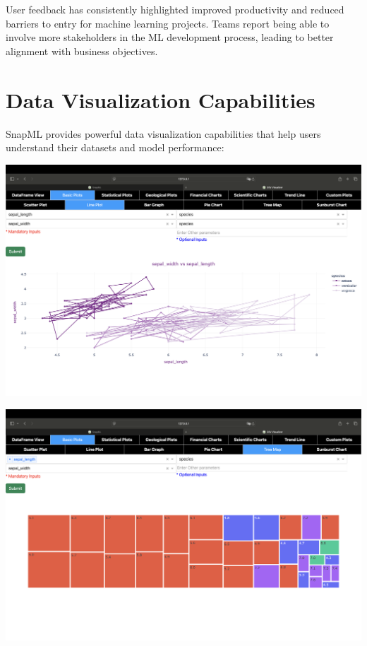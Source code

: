 \documentclass[a0paper,portrait]{article}
\begin{document}
\begin{multicols}{2}
User feedback has consistently highlighted improved productivity and reduced barriers to entry for machine learning projects. Teams report being able to involve more stakeholders in the ML development process, leading to better alignment with business objectives.

\section{Data Visualization Capabilities}

SnapML provides powerful data visualization capabilities that help users understand their datasets and model performance:

\begin{center}
\begin{minipage}{0.48\linewidth}
\includegraphics[width=\linewidth]{范例数据集的可视化2.png}
\end{minipage}
\hfill
\begin{minipage}{0.48\linewidth}
\includegraphics[width=\linewidth]{范例数据集的可视化3.png}
\end{minipage}
\end{center}


\end{multicols}
\end{document}
